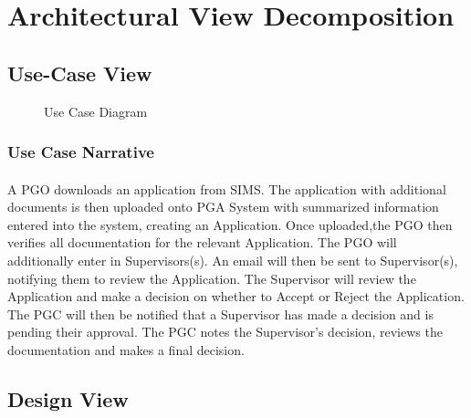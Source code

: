 \documentclass[11pt]{article}
\begin{document}
\section{Architectural View Decomposition}
\subsection{Use-Case View}
\begin{figure}[H]
	\caption{Use Case Diagram}
\end{figure}
\subsubsection{Use Case Narrative}
\paragraph{}A PGO downloads an application from SIMS. The application with additional documents is then uploaded onto PGA System with summarized information entered into the system, creating an Application. Once uploaded,the PGO then verifies all documentation for the relevant Application. The PGO will additionally enter in Supervisors(s). An email will then be sent to Supervisor(s), notifying them to review the Application. The Supervisor will review the Application and make a decision on whether to Accept or Reject the Application. The PGC will then be notified that a Supervisor has made a decision and is pending their approval. The PGC notes the Supervisor’s decision, reviews the documentation and makes a final decision.
\subsection{Design View}
\end{document}
